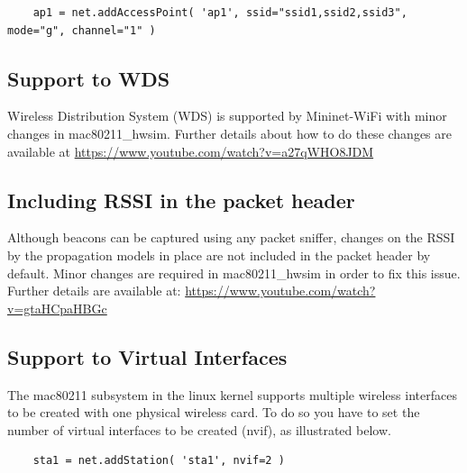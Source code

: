 \begin{verbatim}
    ap1 = net.addAccessPoint( 'ap1', ssid="ssid1,ssid2,ssid3", mode="g", channel="1" )
\end{verbatim}

\subsection{Support to WDS}
Wireless Distribution System (WDS) is supported by Mininet-WiFi with minor changes in mac80211\_hwsim. Further details about how to do these changes are available at \url{https://www.youtube.com/watch?v=a27qWHO8JDM}

\subsection{Including RSSI in the packet header}
Although beacons can be captured using any packet sniffer, changes on the RSSI by the propagation models in place are
not included in the packet header by default. Minor changes are required in mac80211\_hwsim in order to fix this issue. Further details are available at: \url{https://www.youtube.com/watch?v=gtaHCpaHBGc}

\subsection{Support to Virtual Interfaces}

The mac80211 subsystem in the linux kernel supports multiple wireless interfaces to be created with one physical wireless card. To do so you have to set the number of virtual interfaces to be created (nvif), as illustrated below.

\begin{verbatim}
    sta1 = net.addStation( 'sta1', nvif=2 )
\end{verbatim}






